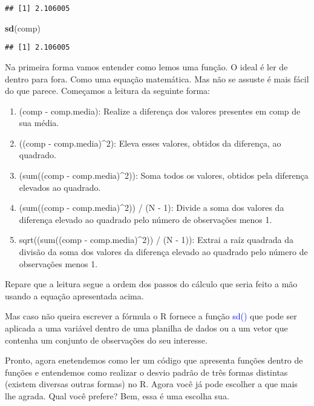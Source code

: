 \documentclass[14pt,titlepage, oneside, openany, a4paper]{book}
\newenvironment{Shaded}{\begin{snugshade}}{\end{snugshade}}
\newcommand{\KeywordTok}[1]{\textcolor[rgb]{0.13,0.29,0.53}{\textbf{#1}}}
\newcommand{\NormalTok}[1]{#1}
\providecommand{\tightlist}{%
  \setlength{\itemsep}{0pt}\setlength{\parskip}{0pt}}
\begin{document}
\begin{verbatim}
## [1] 2.106005
\end{verbatim}

\begin{Shaded}
\begin{Highlighting}[]
\KeywordTok{sd}\NormalTok{(comp)}
\end{Highlighting}
\end{Shaded}

\begin{verbatim}
## [1] 2.106005
\end{verbatim}

Na primeira forma vamos entender como lemos uma função. O ideal é ler de dentro para fora. Como uma equação matemática. Mas não se assuste é mais fácil do que parece. Começamos a leitura da seguinte forma:

\begin{enumerate}
\def\labelenumi{\arabic{enumi}.}
\tightlist
\item
  (comp - comp.media): Realize a diferença dos valores presentes em comp de sua média.
\item
  ((comp - comp.media)\^{}2): Eleva esses valores, obtidos da diferença, ao quadrado.
\item
  (sum((comp - comp.media)\^{}2)): Soma todos os valores, obtidos pela diferença elevados ao quadrado.
\item
  (sum((comp - comp.media)\^{}2)) / (N - 1): Divide a soma dos valores da diferença elevado ao quadrado pelo número de observações menos 1.
\item
  sqrt((sum((comp - comp.media)\^{}2)) / (N - 1)): Extrai a raíz quadrada da divisão da soma dos valores da diferença elevado ao quadrado pelo número de observações menos 1.
\end{enumerate}

Repare que a leitura segue a ordem dos passos do cálculo que seria feito a mão usando a equação apresentada acima.

Mas caso não queira escrever a fórmula o R fornece a função \textcolor{blue}{sd()} que pode ser aplicada a uma variável dentro de uma planilha de dados ou a um vetor que contenha um conjunto de observações do seu interesse.

Pronto, agora enetendemos como ler um código que apresenta funções dentro de funções e entendemos como realizar o desvio padrão de três formas distintas (existem diversas outras formas) no R. Agora você já pode escolher a que mais lhe agrada. Qual você prefere? Bem, essa é uma escolha sua.
\end{document}
